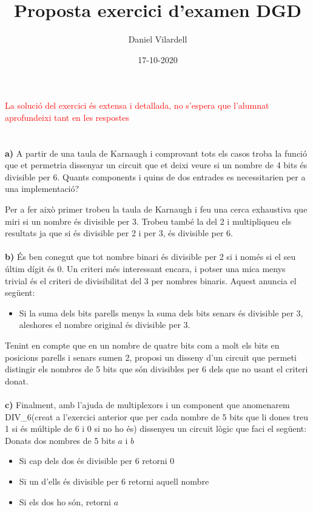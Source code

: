 \documentclass[12pt, a4papre]{article}
\author{Daniel Vilardell}
\title{Proposta exercici d'examen DGD}
\date{17-10-2020}
\begin{document}
	\maketitle
	\begin{center}
	\footnotesize{
		\textcolor{red}{La solució del exercici és extensa i detallada, no s'espera que l'alumnat aprofundeixi tant en les respostes}
		}
	\end{center}
	\newpage
	\section{} 
	\textbf{a)} A partir de una taula de Karnaugh i comprovant tots els casos troba la funció que et permetria dissenyar un circuit que et deixi veure si un nombre de 4 bits és divisible per 6. Quants components i quins de dos entrades es necessitarien per a una implementació? 
	
	Per a fer això primer trobeu la taula de Karnaugh i feu una cerca exhaustiva que miri si un nombre és divisible per 3. Trobeu també la del 2 i multipliqueu els resultats ja que si és divisible per 2 i per 3, és divisible per 6.
	\\\\
	
	\textbf{b)} És ben conegut que tot nombre binari és divisible per 2 si i només si el seu últim dígit és 0. Un criteri més interessant encara, i potser una mica menys trivial és el criteri de divisibilitat del 3 per nombres binaris. Aquest anuncia el següent:
	\begin{itemize}
	\item Si la suma dels bits parells menys la suma dels bits senars és divisible per 3, aleshores el nombre original és divisible per 3. 
	\end{itemize}
	
	Tenint en compte que en un nombre de quatre bits com a molt els bits en posicions parells i senars sumen 2, proposi un disseny d'un circuit que permeti distingir els nombres de 5 bits que són divisibles per 6 dels que no usant el criteri donat.
	\\\\
	
	\textbf{c)} Finalment, amb l'ajuda de multiplexors i un component que anomenarem DIV\_6(creat a l'exercici anterior que per cada nombre de 5 bits que li dones treu 1 si és múltiple de 6 i 0 si no ho és) dissenyeu un circuit lògic que faci el següent: Donats dos nombres de 5 bits $a$ i $b$
	\begin{itemize}
	\item Si cap dels dos és divisible per 6 retorni 0
	\item Si un d'ells és divisible per 6 retorni aquell nombre
	\item Si els dos ho són, retorni $a$ 
	\end{itemize}
	
\end{document}
